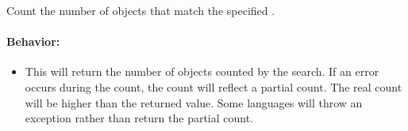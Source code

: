 Count the number of objects that match the specified .

\paragraph{Behavior:}
\begin{itemize}[noitemsep]
\item This will return the number of objects counted by the search.  If an error
    occurs during the count, the count will reflect a partial count.  The real
    count will be higher than the returned value.  Some languages will throw an
    exception rather than return the partial count.
\end{itemize}
